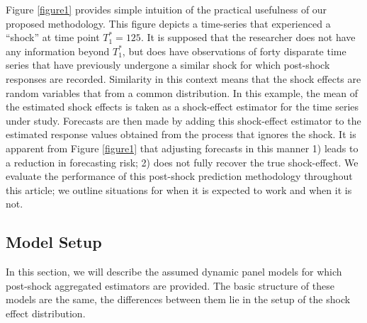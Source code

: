 \documentclass[11pt]{article}
\theoremstyle{definition}
\begin{document}
Figure \ref{figure1} provides simple intuition of the practical usefulness of our proposed methodology. This figure depicts a time-series that experienced a ``shock'' at time point $T_1^* = 125$. It is supposed that the researcher does not have any information beyond $T_1^*$, but does have observations of forty disparate time series that have previously undergone a similar shock for which post-shock responses are recorded. Similarity in this context means that the shock effects are random variables that from a common distribution.
In this example, the mean of the estimated shock effects is taken as a shock-effect estimator for the time series under study. Forecasts are then made by adding this shock-effect estimator to the estimated response values obtained from the process that ignores the shock. It is apparent from Figure \ref{figure1} that adjusting forecasts in this manner 1) leads to a reduction in forecasting risk; 2) does not fully recover the true shock-effect. We evaluate the performance of this post-shock prediction methodology throughout this article; we outline situations for when it is expected to work and when it is not.




\subsection{Model Setup}

\label{modelsetup}

In this section, we will describe the assumed dynamic panel models for which 
post-shock aggregated estimators are provided. The basic structure of these models 
are the same, the differences between them lie in the setup of the shock effect 
distribution.
\end{document}
